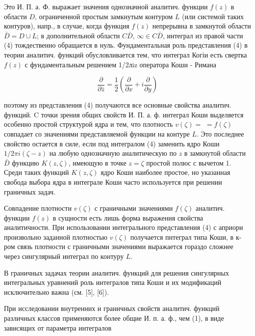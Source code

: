 \documentclass[10pt]{article}
\begin{document}
Это И. П. а. Ф. выражает значения однозначной аналитич. функции $f(z)$ в области $D$, ограниченной простым замкнутым контуром $L$ (или системой таких контуров), напр., в случае, когда функция $f(z)$ непрерывна в замкнутой области $\bar{D}=D \cup L$; в дополнительной области $C \bar{D}$, $\infty \in C \bar{D}$, интеграл из правой части (4) тождественно обращается в нуль. Фундаментальная роль представления (4) в теории аналитич. функций обусловливается тем, что интеграл Когіи есть свертка $f(z)$ с фундаментальным решением 1/2лiz оператора Коши - Римана



\[

\frac{\partial}{\partial \bar{z}}=\frac{1}{2}\left(\frac{\partial}{\partial x}+i \frac{\partial}{\partial y}\right)

\]



поэтому из представления (4) получаются все основные свойства аналитич. функций. $\mathrm{C}$ точки зрения общих свойств И. П. а. ф. интеграл Коши выделяется особенно простой структурой ядра и тем, что плотность $v(\zeta)=$ $=f(\zeta)$ совпадает со значениями представляемой функции на контуре $L$. Это последнее свойство остается в силе, если под интегралом (4) заменить ядро Коши $1 / 2 \pi i(\zeta-z)$ на любую однозначную аналитическую по $z$ в замкнутой области $\bar{D}$ функцию $K(z, \zeta)$, имеющую в точке $z=\zeta$ простой полюс с вычетом 1. Среди таких функций $K(z, \zeta)$ ядро Коши наиболее простое, но указанная свобода выбора ядра в интеграле Коши часто используется при решении граничных задач.



Совпадение плотности $v(\zeta)$ с граничными значениями $f(\zeta)$ аналитич. функции $f(z)$ в сущности есть лишь форма выражения свойства аналитичности. При использовании интегрального представления (4) с априори произвольно заданной плотностью $v(\zeta)$ получается пнтеграл типа Коши, в к-ром связь плотности с граничными значениями выражается гораздо сложнее через сингулярный интеграл по контуру $L$.



В граничных задачах теории аналитич. функций для решения сингулярных интегральных уравнений роль интегралов типа Коши и их модификаций исключительно важна (см. [5], [6]).



При исследовании внутренних и граничных свойств аналитич. функций различных классов применяются более общие И. п. а. ф., чем (1), в виде зависящих от параметра интегралов
\end{document}
